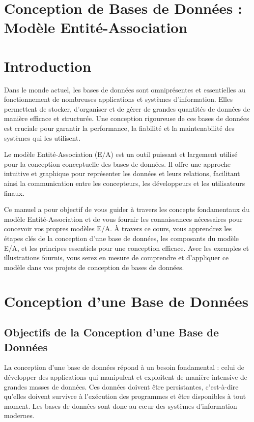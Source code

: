 \documentclass{article}
\begin{document}
\sloppy

\section*{Conception de Bases de Données : Modèle Entité-Association}

\section*{Introduction}

Dans le monde actuel, les bases de données sont omniprésentes et essentielles au fonctionnement de nombreuses applications et systèmes d'information. Elles permettent de stocker, d'organiser et de gérer de grandes quantités de données de manière efficace et structurée. Une conception rigoureuse de ces bases de données est cruciale pour garantir la performance, la fiabilité et la maintenabilité des systèmes qui les utilisent.

Le modèle Entité-Association (E/A) est un outil puissant et largement utilisé pour la conception conceptuelle des bases de données. Il offre une approche intuitive et graphique pour représenter les données et leurs relations, facilitant ainsi la communication entre les concepteurs, les développeurs et les utilisateurs finaux.

Ce manuel a pour objectif de vous guider à travers les concepts fondamentaux du modèle Entité-Association et de vous fournir les connaissances nécessaires pour concevoir vos propres modèles E/A.  À travers ce cours, vous apprendrez les étapes clés de la conception d'une base de données, les composants du modèle E/A, et les principes essentiels pour une conception efficace.  Avec les exemples et illustrations fournis, vous serez en mesure de comprendre et d'appliquer ce modèle dans vos projets de conception de bases de données.

\section{Conception d'une Base de Données}

\subsection{Objectifs de la Conception d'une Base de Données}

La conception d'une base de données répond à un besoin fondamental : celui de développer des applications qui manipulent et exploitent de manière intensive de grandes masses de données.  Ces données doivent être persistantes, c'est-à-dire qu'elles doivent survivre à l'exécution des programmes et être disponibles à tout moment.  Les bases de données sont donc au cœur des systèmes d'information modernes.
\end{document}
